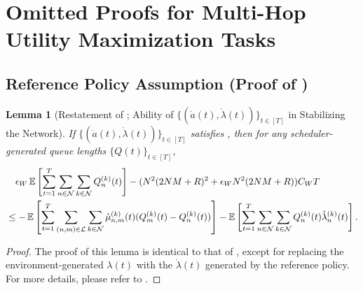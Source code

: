 \documentclass[11pt,fullpage,letterpaper]{article} %
\newtheorem{lemma}[theorem]{Lemma}
\renewcommand{\bm}[1]{#1}%
\newcommand{\E}{\operatornamewithlimits{\mathbb{E}}}
\newcommand{\mN}{{\mathcal N}}
\newcommand{\mL}{{\mathcal L}}
\begin{document}
\section{Omitted Proofs for Multi-Hop Utility Maximization Tasks}
\subsection{Reference Policy Assumption (Proof of )}\label{sec:multi-hop utility network stability appendix}
\begin{lemma}[Restatement of ; Ability of $\{(\mathring{\bm a}(t),\mathring{\bm \lambda}(t))\}_{t\in [T]}$ in Stabilizing the Network]
If $\{(\mathring{\bm a}(t),\mathring{\bm \lambda}(t))\}_{t\in [T]}$ satisfies , then for any scheduler-generated queue lengths $\{\bm Q(t)\}_{t\in [T]}$,
\begin{align*}
&\quad \epsilon_W \E\left [\sum_{t=1}^T \sum_{n\in \mN} \sum_{k\in \mN} Q_n^{(k)}(t)\right ] - (N^2 (2NM+R)^2 + \epsilon_W N^2 (2NM+R)) C_W T \nonumber\\
&\le-\E\left [\sum_{t=1}^T \sum_{(n,m)\in \mL}\sum_{k\in \mN} \mathring \mu_{n,m}^{(k)}(t) (Q_m^{(k)}(t) - Q_n^{(k)}(t))\right ] - \E\left [\sum_{t=1}^T \sum_{n\in \mN} \sum_{k\in \mN} Q_n^{(k)}(t) \mathring \lambda_n^{(k)}(t)\right ].
\end{align*}
\end{lemma}
\begin{proof}
The proof of this lemma is identical to that of , except for replacing the environment-generated $\bm \lambda(t)$ with the $\mathring{\bm \lambda}(t)$ generated by the reference policy. For more details, please refer to .
\end{proof}
\end{document}
